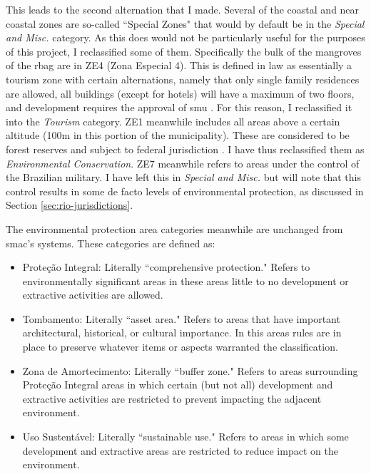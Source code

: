 This leads to the second alternation that I made. Several of the coastal and near coastal zones are so-called ``Special Zones" that would by default be in the \textit{Special and Misc.} category. As this does would not be particularly useful for the purposes of this project, I reclassified some of them. Specifically the bulk of the mangroves of the \ac{rbag} are in ZE4 (Zona Especial 4). This is defined in law as essentially a tourism zone with certain alternations, namely that only single family residences are allowed, all buildings (except for hotels) will have a maximum of two floors, and development requires the approval of \ac{smu} \cite{prefeitodacidadedoriodejaneiroDecretoNo3221976}. For this reason, I reclassified it into the \textit{Tourism} category. ZE1 meanwhile includes all areas above a certain altitude (100m in this portion of the municipality). These are considered to be forest reserves and subject to federal jurisdiction \cite{prefeitodacidadedoriodejaneiroDecretoNo3221976}. I have thus reclassified them as \textit{Environmental Conservation}. ZE7 meanwhile refers to areas under the control of the Brazilian military. I have left this in \textit{Special and Misc.} but will note that this control results in some de facto levels of environmental protection, as discussed in Section \ref{sec:rio-jurisdictions}.

The environmental protection area categories meanwhile are unchanged from \ac{smac}'s systems. These categories are defined as:

\begin{itemize}[itemsep=0pt,parsep=0pt]
	\item{Proteção Integral: Literally ``comprehensive protection." Refers to environmentally significant areas in these areas little to no development or extractive activities are allowed.}
	\item{Tombamento: Literally ``asset area." Refers to areas that have important architectural, historical, or cultural importance. In this areas rules are in place to preserve whatever items or aspects warranted the classification.}
	\item{Zona de Amortecimento: Literally ``buffer zone." Refers to areas surrounding Proteção Integral areas in which certain (but not all) development and extractive activities are restricted to prevent impacting the adjacent environment.}
	\item{Uso Sustentável: Literally ``sustainable use." Refers to areas in which some development and extractive areas are restricted to reduce impact on the environment.}
\end{itemize}


